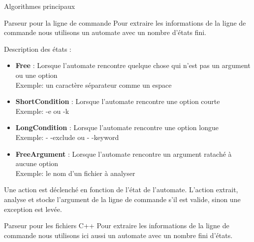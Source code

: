 \documentclass{article}
\begin{document}
\begin{section}{Algorithmes principaux}

  \begin{subsection}{Parseur pour la ligne de commande}
  Pour extraire les informations de la ligne de commande nous utilisons un automate avec un nombre d'états fini.
  
  \begin{paragraph}{Description des états :}
    \begin{itemize}
      \item \textbf{Free} : Lorsque l'automate rencontre quelque chose qui n'est pas un argument ou une option \\Exemple: un caractère séparateur comme un espace
      \item \textbf{ShortCondition} : Lorsque l'automate rencontre une option courte \\Exemple: -e ou -k
      \item \textbf{LongCondition} : Lorsque l'automate rencontre une option longue \\Exemple: - -exclude ou - -keyword
      \item \textbf{FreeArgument} : Lorsque l'automate rencontre un argument rataché à aucune option\\Exemple: le nom d'un fichier à analyser\\
    \end{itemize}
  \end{paragraph}
  
  Une action est déclenché en fonction de l'état de l'automate. L'action extrait, analyse et stocke l'argument de la ligne de commande s'il est valide, sinon une exception est levée.
  \end{subsection}

  \begin{subsection}{Parseur pour les fichiers C++}
  Pour extraire les informations de la ligne de commande nous utilisons ici aussi un automate avec un nombre fini d'états.
  

\end{subsection}
\end{section}
\end{document}
